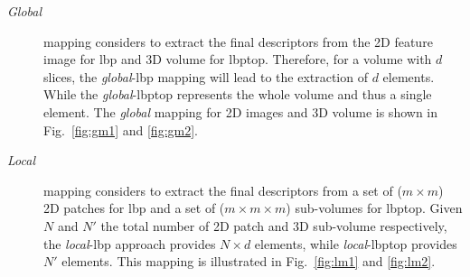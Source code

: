 \begin{description}
\item[\emph{Global}] mapping considers to extract the final descriptors from the 2D feature image for \ac{lbp} and 3D volume for \ac{lbptop}.
Therefore, for a volume with $d$ slices, the \emph{global}-\ac{lbp} mapping will lead to the extraction of $d$ elements.
While the \emph{global}-\ac{lbptop} represents the whole volume and thus a single element.
The \emph{global} mapping for 2D images and 3D volume is shown in Fig.~\ref{fig:gm1} and \ref{fig:gm2}.

\item[\emph{Local}] mapping considers to extract the final descriptors from a set of ($m \times m$) 2D patches for \ac{lbp} and a set of ($ m \times m \times m$) sub-volumes for \ac{lbptop}.
Given $N$ and $N'$ the total number of 2D patch and 3D sub-volume respectively, the \emph{local}-\ac{lbp} approach provides $N \times d$ elements, while \emph{local}-\ac{lbptop} provides $N'$ elements.
This mapping is illustrated in Fig.~\ref{fig:lm1} and \ref{fig:lm2}.


\end{description}

%


